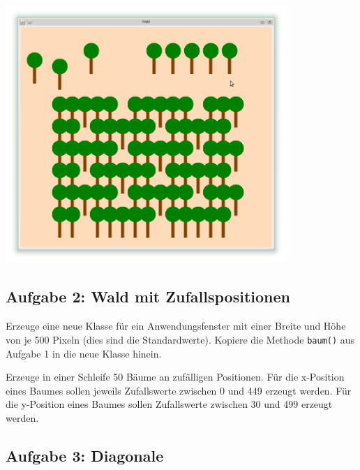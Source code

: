 \begin{center}
\includegraphics[width=0.8\textwidth]{./inf/SEKII/09_Java_Farben_und_Zufall/Aufgabe1.png}
\end{center}


\subsection{Aufgabe 2: Wald mit Zufallspositionen}

\begin{compactenum}[a)]
\item Erzeuge eine neue Klasse für ein Anwendungsfenster mit einer Breite und
Höhe von je 500 Pixeln (dies sind die Standardwerte). Kopiere die Methode
\lstinline|baum()| aus Aufgabe 1 in die neue Klasse hinein.
\item Erzeuge in einer Schleife 50 Bäume an zufälligen Positionen. Für die
x-Position eines Baumes sollen jeweils Zufallswerte zwischen 0 und 449 erzeugt
werden. Für die y-Position eines Baumes sollen Zufallswerte zwischen 30 und 499
erzeugt werden.
\end{compactenum}


\subsection{Aufgabe 3: Diagonale}

